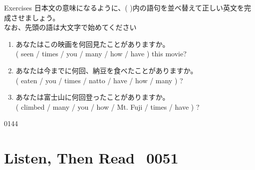 \documentclass[aspectratio=169,xcolor={dvipsnames,table}]{beamer}
\newcommand{\myaudio}[1]{\href{#1}{\faVolumeUp}}
\begin{document}
\begin{frame}[plain]{Exercises}
 日本文の意味になるように、( )内の語句を並べ替えて正しい英文を完成させましょう。\\
なお、先頭の語は大文字で始めてください

\begin{enumerate}
    \item あなたはこの映画を何回見たことがありますか。\\
    ( seen / times / you / many / how / have ) this movie?
    \\

    \item あなたは今までに何回、納豆を食べたことがありますか。\\
    ( eaten / you / times / natto / have / how / many ) ?
    \\

    \item あなたは富士山に何回登ったことがありますか。\\
    ( climbed / many / you / how / Mt. Fuji / times / have ) ?
    \\
\end{enumerate}
\hfill{\tiny 0144}\,{\scriptsize \myaudio{./audio/013_have_pp_keiken_063.mp3}}

\end{frame}
\section{Listen, Then Read\,\,\,\,\,{\tiny 0051}\,{\scriptsize \myaudio{./audio/013_have_pp_keiken_reading.mp3}}}
\end{document}
